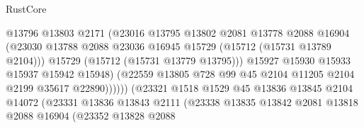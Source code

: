 \begin{lexlean}{RustCore}
\begin{coremodule}
                                        @13796
                                        @13803
                                        @2171
                                        (@23016
                                          @13795
                                          @13802
                                          @2081
                                          @13778
                                          @2088
                                          @16904
                                          (@23030
                                            @13788
                                            @2088
                                            @23036
                                            @16945
                                            @15729
                                            (@15712 (@15731 @13789 @2104)))
                                          @15729
                                          (@15712 (@15731 @13779 @13795)))
                                        @15927
                                        @15930
                                        @15933
                                        @15937
                                        @15942
                                        @15948)
                                      (@22559
                                        @13805
                                        @728
                                        @99
                                        @45
                                        @2104
                                        @11205
                                        @2104
                                        @2199
                                        @35617
                                        @22890))))))
                            (@23321
                              @1518
                              @1529
                              @45
                              @13836
                              @13845
                              @2104
                              @14072
                              (@23331
                                @13836
                                @13843
                                @2111
                                (@23338
                                  @13835
                                  @13842
                                  @2081
                                  @13818
                                  @2088
                                  @16904
                                  (@23352
                                    @13828
                                    @2088

\end{coremodule}
\end{lexlean}
